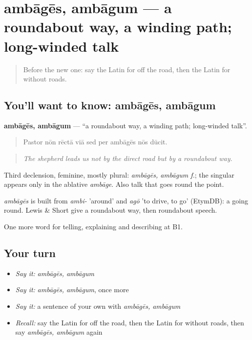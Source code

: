 \section[ambāgēs, ambāgum]{ambāgēs, ambāgum — a roundabout way, a winding path; long-winded talk}

\label{lesson:LA-C452-ambages}



\begin{quote}
Before the new one: say the Latin for off the road, then the Latin for without roads.
\end{quote}

\subsection*{You'll want to know: ambāgēs, ambāgum}
\textbf{ambāgēs, ambāgum} — \textquotedblleft{}a roundabout way, a winding path; long-winded talk\textquotedblright{}.

\begin{quote}
Pastor nōn rēctā viā sed per ambāgēs nōs dūcit.
\end{quote}

\begin{quote}
\emph{The shepherd leads us not by the direct road but by a roundabout way.}
\end{quote}

Third declension, feminine, mostly plural: \emph{ambāgēs, ambāgum f.}; the singular appears only in the ablative \emph{ambāge}. Also talk that goes round the point.

\begin{cousinweb}
\emph{ambāgēs} is built from \emph{ambi-} 'around' and \emph{agō} 'to drive, to go' (EtymDB): a going round. Lewis \& Short give a roundabout way, then roundabout speech.
\end{cousinweb}

\begin{grammarlens}[title={What you've built}]
One more word for telling, explaining and describing at B1.
\end{grammarlens}

\subsection*{Your turn}
\begin{itemize}
\raggedright
  \item \emph{Say it:} \emph{ambāgēs, ambāgum}
  \item \emph{Say it:} \emph{ambāgēs, ambāgum}, once more
  \item \emph{Say it:} a sentence of your own with \emph{ambāgēs, ambāgum}
  \item \emph{Recall:} say the Latin for off the road, then the Latin for without roads, then say \emph{ambāgēs, ambāgum} again
\end{itemize}

